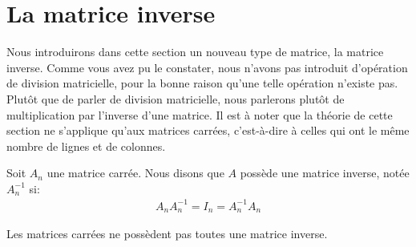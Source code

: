 \documentclass[]{book}
\providecommand{\tightlist}{%
  \setlength{\itemsep}{0pt}\setlength{\parskip}{0pt}}
\theoremstyle{definition}
\theoremstyle{definition}
\theoremstyle{definition}
\theoremstyle{remark}
\let\BeginKnitrBlock\begin \let\EndKnitrBlock\end
\begin{document}

\hypertarget{la-matrice-inverse}{%
\section{La matrice inverse}\label{la-matrice-inverse}}

Nous introduirons dans cette section un nouveau type de matrice, la matrice inverse. Comme vous avez pu le constater, nous n'avons pas introduit d'opération de division matricielle, pour la bonne raison qu'une telle opération n'existe pas. Plutôt que de parler de division matricielle, nous parlerons plutôt de multiplication par l'inverse d'une matrice. Il est à noter que la théorie de cette section ne s'applique qu'aux matrices carrées, c'est-à-dire à celles qui ont le même nombre de lignes et de colonnes.

\BeginKnitrBlock{definition}[La matrice inverse]
\protect\hypertarget{def:unnamed-chunk-72}{}{\label{def:unnamed-chunk-72} {} }Soit \(A_{n}\) une matrice carrée. Nous disons que \(A\) possède une matrice inverse, notée \(A^{-1}_n\) si:
\begin{align*}
A_n A^{-1}_n = I_n = A^{-1}_n A_n
\end{align*}
\EndKnitrBlock{definition}

\BeginKnitrBlock{remark}
{}Les matrices carrées ne possèdent pas toutes une matrice inverse.
\EndKnitrBlock{remark}
\end{document}
